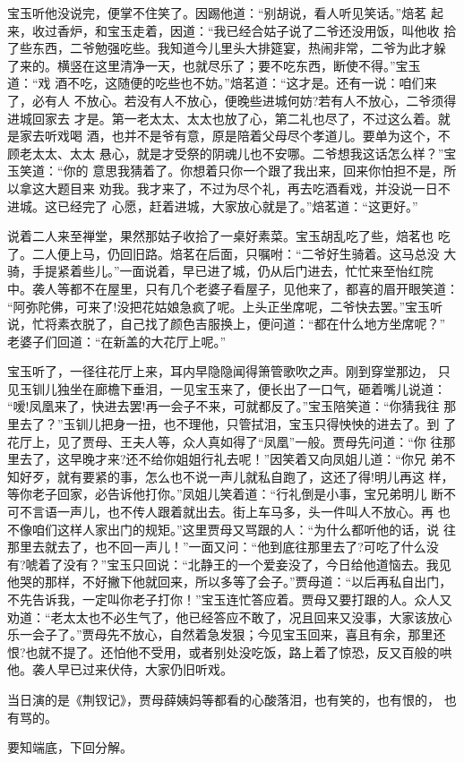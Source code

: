 宝玉听他没说完，便掌不住笑了。因踢他道：“别胡说，看人听见笑话。”焙茗
起来，收过香炉，和宝玉走着，因道：“我已经合姑子说了二爷还没用饭，叫他收
拾了些东西，二爷勉强吃些。我知道今儿里头大排筵宴，热闹非常，二爷为此才躲
了来的。横竖在这里清净一天，也就尽乐了；要不吃东西，断使不得。”宝玉道：“戏
酒不吃，这随便的吃些也不妨。”焙茗道：“这才是。还有一说：咱们来了，必有人
不放心。若没有人不放心，便晚些进城何妨?若有人不放心，二爷须得进城回家去
才是。第一老太太、太太也放了心，第二礼也尽了，不过这么着。就是家去听戏喝
酒，也并不是爷有意，原是陪着父母尽个孝道儿。要单为这个，不顾老太太、太太
悬心，就是才受祭的阴魂儿也不安哪。二爷想我这话怎么样？”宝玉笑道：“你的
意思我猜着了。你想着只你一个跟了我出来，回来你怕担不是，所以拿这大题目来
劝我。我才来了，不过为尽个礼，再去吃酒看戏，并没说一日不进城。这已经完了
心愿，赶着进城，大家放心就是了。”焙茗道：“这更好。”

说着二人来至禅堂，果然那姑子收拾了一桌好素菜。宝玉胡乱吃了些，焙茗也
吃了。二人便上马，仍回旧路。焙茗在后面，只嘱咐：“二爷好生骑着。这马总没
大骑，手提紧着些儿。”一面说着，早已进了城，仍从后门进去，忙忙来至怡红院
中。袭人等都不在屋里，只有几个老婆子看屋子，见他来了，都喜的眉开眼笑道：
“阿弥陀佛，可来了!没把花姑娘急疯了呢。上头正坐席呢，二爷快去罢。”宝玉听
说，忙将素衣脱了，自己找了颜色吉服换上，便问道：“都在什么地方坐席呢？”
老婆子们回道：“在新盖的大花厅上呢。”

宝玉听了，一径往花厅上来，耳内早隐隐闻得箫管歌吹之声。刚到穿堂那边，
只见玉钏儿独坐在廊檐下垂泪，一见宝玉来了，便长出了一口气，砸着嘴儿说道：
“嗳!凤凰来了，快进去罢!再一会子不来，可就都反了。”宝玉陪笑道：“你猜我往
那里去了？”玉钏儿把身一扭，也不理他，只管拭泪，宝玉只得怏怏的进去了。到
了花厅上，见了贾母、王夫人等，众人真如得了“凤凰”一般。贾母先问道：“你
往那里去了，这早晚才来?还不给你姐姐行礼去呢！”因笑着又向凤姐儿道：“你兄
弟不知好歹，就有要紧的事，怎么也不说一声儿就私自跑了，这还了得!明儿再这
样，等你老子回家，必告诉他打你。”凤姐儿笑着道：“行礼倒是小事，宝兄弟明儿
断不可不言语一声儿，也不传人跟着就出去。街上车马多，头一件叫人不放心。再
也不像咱们这样人家出门的规矩。”这里贾母又骂跟的人：“为什么都听他的话，说
往那里去就去了，也不回一声儿！”一面又问：“他到底往那里去了?可吃了什么没
有?唬着了没有？”宝玉只回说：“北静王的一个爱妾没了，今日给他道恼去。我见
他哭的那样，不好撇下他就回来，所以多等了会子。”贾母道：“以后再私自出门，
不先告诉我，一定叫你老子打你！”宝玉连忙答应着。贾母又要打跟的人。众人又
劝道：“老太太也不必生气了，他已经答应不敢了，况且回来又没事，大家该放心
乐一会子了。”贾母先不放心，自然着急发狠；今见宝玉回来，喜且有余，那里还
恨?也就不提了。还怕他不受用，或者别处没吃饭，路上着了惊恐，反又百般的哄
他。袭人早已过来伏侍，大家仍旧听戏。

当日演的是《荆钗记》，贾母薛姨妈等都看的心酸落泪，也有笑的，也有恨的，
也有骂的。

要知端底，下回分解。